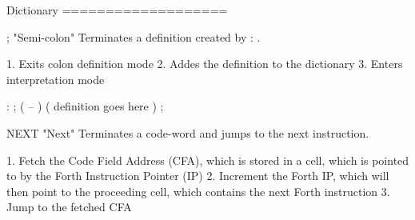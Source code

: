 \documentclass[
    letterpaper, %
	fontsize=10pt, %
	twoside=true, %
	numbers=noenddot, %
]{kaobook}
\begin{document}



\renewcommand{\nomname}{Notation} %
\renewcommand{\nompreamble}{The next list describes several symbols that will be later used within the body of the document.} %

\printnomenclature %





\glsaddall %
\printglossary[title=Glossary, toctitle=Glossary,nonumberlist] %

Dictionary
===================

;  "Semi-colon"
Terminates a definition created by : .

1. Exits colon definition mode
2. Addes the definition to the dictionary
3. Enters interpretation mode

    : ; ( -- )
        ( definition goes here ) ;


NEXT  "Next"
Terminates a code-word and jumps to the next instruction.

1. Fetch the Code Field Address (CFA),
   which is stored in a cell,
   which is pointed to by the Forth Instruction Pointer (IP)
2. Increment the Forth IP,
   which will then point to the proceeding cell,
   which contains the next Forth instruction
3. Jump to the fetched CFA
\end{document}

